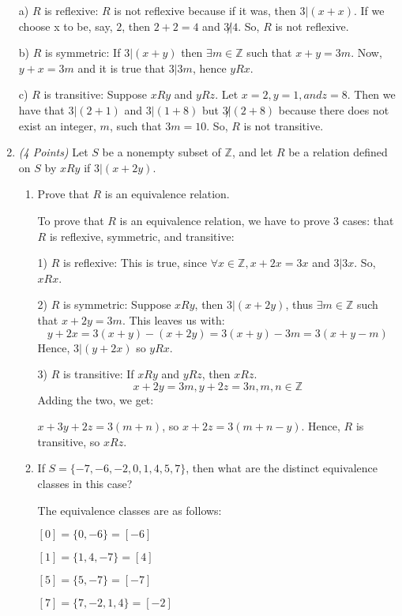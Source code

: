 \documentclass[10pt]{article} %
\newcommand{\Z}{\mathbb{Z}}
\newcommand{\points}[1]{{\it (#1 Points)}}
\begin{document}
\begin{enumerate}
\bigskip


a) $R$ is reflexive: $R$ is not reflexive because if it was, then $3|(x+x)$.  If we choose x to be, say, $2$, then $2+2=4$ and $3\not |4$.  So, $R$ is not reflexive.  

b) $R$ is symmetric: If $3|(x+y)$ then $\exists m \in \Z$ such that $x+y=3m$.  Now, $y+x=3m$ and it is true that $3|3m$, hence $yRx$.  

c) $R$ is transitive: Suppose $xRy$ and $yRz$.  Let $x=2, y=1, and z=8$.  Then we have that $3|(2+1)$ and $3|(1+8)$ but $3\not|(2+8)$ because there does not exist an integer, $m$, such that $3m=10$.  So, $R$ is not transitive.  

\item \points{4} Let $S$ be a nonempty subset of $\Z$, and let $R$ be a relation defined on $S$ by $x R y$ if $3 | (x+2y)$.
\begin{enumerate}
\item Prove that $R$ is an equivalence relation.

\bigskip

 To prove that $R$ is an equivalence relation, we have to prove 3 cases: that $R$ is reflexive, symmetric, and transitive:

1) $R$ is reflexive: This is true, since $\forall x \in \Z, x+2x=3x$ and $3|3x$.  So, $xRx$.  

2) $R$ is symmetric: Suppose $xRy$, then $3|(x+2y)$, thus $\exists m \in \Z$ such that $x+2y=3m$.  This leaves us with: 
$$y+2x=3(x+y)-(x+2y)=3(x+y)-3m=3(x+y-m)$$
Hence, $3|(y+2x)$ so $yRx$.  

3) $R$ is transitive: If $xRy$ and $yRz$, then $xRz$.
$$x+2y=3m, y+2z=3n, m,n \in \Z$$
Adding the two, we get: 

$x+3y+2z=3(m+n)$, so $x+2z=3(m+n-y)$.  Hence, $R$ is transitive, so $xRz$.  

\item If $S=\{-7, -6, -2, 0, 1, 4, 5, 7\}$, then what are the distinct equivalence classes in this case?

\bigskip

 The equivalence classes are as follows:

$[0]=\{0,-6\} = [-6]$

$[1]=\{1,4,-7\} = [4]$

$[5]=\{5,-7\} = [-7]$

$[7]=\{7,-2,1,4\} = [-2]$


\end{enumerate}
\end{enumerate}
\end{document}

